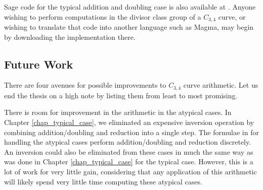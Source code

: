 Sage code for the typical addition and doubling case is also available at \cite{github}.
Anyone wishing to perform computations in the divisor class group of a $C_{3,4}$ curve,
or wishing to translate that code into another language such as Magma,
may begin by downloading the implementation there.





\subsection{Future Work}
\label{sec_future_work}

There are four avenues for possible improvements to $C_{3,4}$ curve arithmetic.
Let us end the thesis on a high note by listing them from least to most promising.

There is room for improvement in the arithmetic in the atypical cases.
In Chapter \ref{chap_typical_case}, we eliminated an expensive inversion operation
by combining addition/doubling and reduction into a single step.
The formulae in \cite{github} for handling the atypical cases perform addition/doubling and reduction discretely.
An inversion could also be eliminated from these cases
in much the same way as was done in Chapter \ref{chap_typical_case} for the typical case.
However, this is a lot of work for very little gain,
considering that any application of this arithmetic will likely spend very little time computing these atypical cases.

